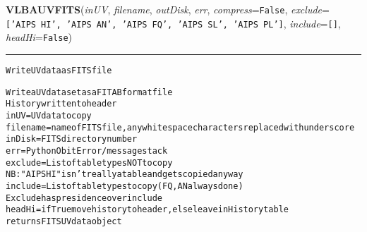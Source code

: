     \begin{boxedminipage}{\textwidth}

    \raggedright \textbf{VLBAUVFITS}(\textit{inUV}, \textit{filename}, \textit{outDisk}, \textit{err}, \textit{compress}=\texttt{F\-a\-l\-s\-e\-}, \textit{exclude}=\texttt{[\-'\-A\-I\-P\-S\-~\-H\-I\-'\-,\-~\-'\-A\-I\-P\-S\-~\-A\-N\-'\-,\-~\-'\-A\-I\-P\-S\-~\-F\-Q\-'\-,\-~\-'\-A\-I\-P\-S\-~\-S\-L\-'\-,\-~\-'\-A\-I\-P\-S\-~\-P\-L\-'\-]\-}, \textit{include}=\texttt{[\-]\-}, \textit{headHi}=\texttt{F\-a\-l\-s\-e\-})

    \vspace{-1.5ex}

    \rule{\textwidth}{0.5\fboxrule}
\begin{alltt}
Write UV data as FITS file

Write a UV data set as a FITAB format file
History written to header
inUV       = UV data to copy
filename   = name of FITS file, any whitespace characters replaced with underscore 
inDisk     = FITS directory number
err        = Python Obit Error/message stack
exclude    = List of table types NOT to copy
             NB: "AIPS HI" isn't really a table and gets copied anyway
include    = List of table types to copy (FQ, AN always done )
             Exclude has presidence over include
headHi     = if True move history to header, else leave in History table
returns FITS UV data object\end{alltt}

    \vspace{1ex}

    \end{boxedminipage}

    \label{VLBACal:VLBAUVFITSTab}
    \vspace{0.5ex}

